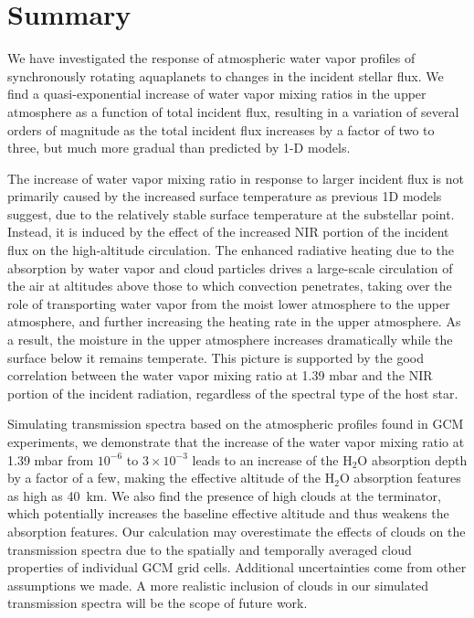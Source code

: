 \documentclass[11pt,numberedappendix,twocolappendix,]{emulateapj}
\def\water{H$_2$O}
\def\preslevel{1.39 mbar}
\def\wv{water vapor}
\begin{document}
\section{Summary}
\label{s:summary}

We have investigated the response of atmospheric \wv{} profiles of synchronously rotating aquaplanets to changes in the incident stellar flux. 
We find a quasi-exponential increase of \wv{} mixing ratios in the upper atmosphere as a function of total incident flux, resulting in a variation of several orders of magnitude as the total incident flux increases by a factor of two to three,  but much more gradual than predicted by 1-D models. 

The increase of \wv{} mixing ratio in response to larger incident flux is not primarily caused by the increased surface temperature as previous 1D models suggest, due to the relatively stable surface temperature at the substellar point. 
Instead, it is induced by the effect of the increased NIR portion of the incident flux on the high-altitude circulation. 
The enhanced radiative heating due to the absorption by \wv{} and cloud particles drives a large-scale circulation of the air at altitudes above those to which convection penetrates, taking over the role of transporting \wv{} from the moist lower atmosphere to the upper atmosphere, and further increasing the heating rate in the upper atmosphere.
As a result, the moisture in the upper atmosphere increases dramatically while the surface below it remains temperate. 
This picture is supported by the good correlation between the \wv{} mixing ratio at \preslevel{} and the NIR portion of the incident radiation, regardless of the spectral type of the host star. 

Simulating transmission spectra based on the atmospheric profiles found in GCM experiments, 
we demonstrate that the increase of the \wv{} mixing ratio at \preslevel{} from $10^{-6}$ to $3 \times 10^{-3}$ leads to an increase of the \water{} absorption depth by a factor of a few, making the effective altitude of the \water{} absorption features as high as 40~km. 
We also find the presence of high clouds at the terminator, which    potentially increases the baseline effective altitude and thus weakens the absorption features. 
Our calculation may overestimate the effects of clouds on the transmission spectra due to the spatially and temporally averaged cloud properties of individual GCM grid cells.
Additional uncertainties come from other assumptions we made. 
A more realistic inclusion of clouds in our simulated transmission spectra will be the scope of future work. 
\end{document}
